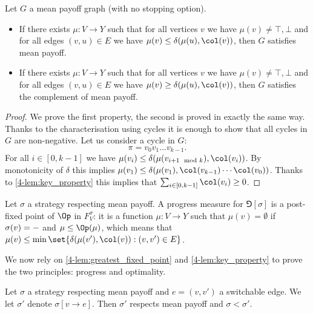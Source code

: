 \begin{lemma}
\label{4-lem:key_property}
Let $G$ a mean payoff graph (with no stopping option).
\begin{itemize}
	\item If there exists $\mu : V \to Y$ such that for all vertices $v$ we have $\mu(v) \neq \top,\bot$
	and for all edges $(v,u) \in E$ we have $\mu(v) \le \delta(\mu(u),\col(v))$,
	then $G$ satisfies mean payoff.
	\item If there exists $\mu : V \to Y$ such that for all vertices $v$ we have $\mu(v) \neq \top,\bot$
	and for all edges $(v,u) \in E$ we have $\mu(v) \ge \delta(\mu(u),\col(v))$,
	then $G$ satisfies the complement of mean payoff.
\end{itemize}
\end{lemma}
\begin{proof}
We prove the first property, the second is proved in exactly the same way.
Thanks to the characterisation using cycles it is enough to show that all cycles in $G$ are non-negative.
Let us consider a cycle in $G$:
\[
\pi = v_0 v_1 \dots v_{k-1}.
\]
For all $i \in [0,k-1]$ we have $\mu(v_i) \le \delta(\mu(v_{i+1 \mod k}),\col(v_i))$.
By monotonicity of $\delta$ this implies $\mu(v_1) \le \delta(\mu(v_1),\col(v_{k-1}) \cdots \col(v_0))$.
Thanks to \cref{4-lem:key_property} this implies that $\sum_{i \in [0,k-1]} \col(v_i) \ge 0$.
\end{proof}

Let $\sigma$ a strategy respecting mean payoff. 
A progress measure for $\Game[\sigma]$ is a post-fixed point of $\Op$ in $F^\sigma_V$:
it is a function $\mu : V \to Y$ such that $\mu(v) = \emptyset$ if $\sigma(v) = \mathtt{-}$ and $\mu \le \Op(\mu)$,
which means that $\mu(v) \le \min \set{ \delta(\mu(v'),\col(v)) : (v,v') \in E}$.

We now rely on \cref{4-lem:greatest_fixed_point} and \cref{4-lem:key_property} to prove the two principles: progress and optimality.

\begin{lemma}[Progress]
Let $\sigma$ a strategy respecting mean payoff and $e = (v,v')$ a switchable edge.
We let $\sigma'$ denote $\sigma[v \to e]$.
Then $\sigma'$ respects mean payoff and $\sigma < \sigma'$.
\end{lemma}

